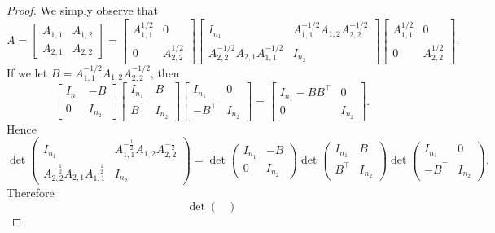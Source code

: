 \documentclass[12pt]{article}
\begin{document}
\begin{proof}
We simply observe that
\[
A =
\begin{bmatrix}
A_{1,1} & A_{1,2} \\
A_{2,1} & A_{2,2}
\end{bmatrix}
=
\begin{bmatrix}
A_{1,1}^{1/2} & 0 \\
0 & A_{2,2}^{1/2}
\end{bmatrix}
\begin{bmatrix}
I_{n_1} & A_{1,1}^{-1/2} A_{1,2} A_{2,2}^{-1/2} \\
A_{2,2}^{-1/2} A_{2,1} A_{1,1}^{-1/2} & I_{n_2}
\end{bmatrix}
\begin{bmatrix}
A_{1,1}^{1/2} & 0 \\
0 & A_{2,2}^{1/2}
\end{bmatrix}.
\]
If we let $B = A_{1,1}^{-1/2} A_{1,2} A_{2,2}^{-1/2}$, then
\[
\begin{bmatrix}
I_{n_1} & -B \\
0 & I_{n_2}
\end{bmatrix}
\begin{bmatrix}
I_{n_1} & B \\
B^\top & I_{n_2}
\end{bmatrix}
\begin{bmatrix}
I_{n_1} & 0 \\
-B^\top & I_{n_2}
\end{bmatrix}
=
\begin{bmatrix}
I_{n_1} - BB^\top & 0 \\
0 & I_{n_2}
\end{bmatrix}.
\]
Hence
\[
\det\!\begin{pmatrix}
I_{n_1} & A^{-\frac{1}{2}}_{1,1} A_{1,2} A^{-\frac{1}{2}}_{2,2} \\
A^{-\frac{1}{2}}_{2,2} A_{2,1} A^{-\frac{1}{2}}_{1,1} & I_{n_2}
\end{pmatrix}
=
\det\!\begin{pmatrix}
I_{n_1} & -B \\
0 & I_{n_2}
\end{pmatrix}
\det\!\begin{pmatrix}
I_{n_1} & B \\
B^\top & I_{n_2}
\end{pmatrix}
\det\!\begin{pmatrix}
I_{n_1} & 0 \\
-B^\top & I_{n_2}
\end{pmatrix}.
\]
Therefore
\[
\det\!\begin{pmatrix}

\end{pmatrix}\]
\end{proof}
\end{document}
